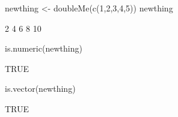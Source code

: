 \begin{Schunk}
\begin{Sinput}
 newthing <- doubleMe(c(1,2,3,4,5))
 newthing
\end{Sinput}
\begin{Soutput}
[1]  2  4  6  8 10
\end{Soutput}
\begin{Sinput}
 is.numeric(newthing)
\end{Sinput}
\begin{Soutput}
[1] TRUE
\end{Soutput}
\begin{Sinput}
 is.vector(newthing)
\end{Sinput}
\begin{Soutput}
[1] TRUE
\end{Soutput}
\end{Schunk}
